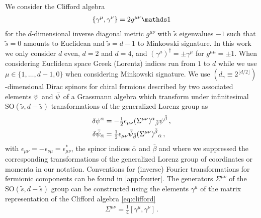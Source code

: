We consider the Clifford algebra
\begin{align}
	\{\gamma^\mu,\gamma^\nu\}=2 g^{\mu\nu}\Id\label{eq:clifford}
\end{align}
for the $d$-dimensional inverse diagonal metric $g^{\mu\nu}$ with $\tilde{s}$ eigenvalues $-1$ such that $\tilde{s}=0$ amounts to Euclidean and $\tilde{s}=d-1$ to Minkowski signature.
In this work we only consider $d$ even, \viz{} $d=2$ and $d=4$, and $(\gamma^\mu)^\dagger = \pm\gamma^\mu$ for $g^{\mu\mu}=\pm1$.
When considering Euclidean space Greek (Lorentz) indices run from $1$ to $d$ while we use $\mu\in\{1,\ldots,d-1,0\}$ when considering Minkowski signature.
We use ${(d_\gamma\equiv 2^{\lfloor d/2\rfloor})}$-dimensional Dirac spinors for chiral fermions described by two associated elements $\psi$ and $\bar{\psi}$ of a Grassmann algebra which transform under infinitesimal $\mathrm{SO}(\tilde{s},d-\tilde{s})$ transformations of the generalized Lorenz group as
\begin{align}
	\delta\psi^{\bar{\alpha}} &= -\tfrac{1}{2}\epsilon_{\mu\nu}(\Sigma^{\mu\nu})^{\bar{\alpha}}{}_{\bar{\beta}} \psi^{\bar{\beta}} \, ,\\
	\delta\bar{\psi}_{\bar{\alpha}} &= \tfrac{1}{2}\epsilon_{\mu\nu}\bar{\psi}_{\bar{\beta}}(\Sigma^{\mu\nu})^{\bar{\beta}}{}_{\bar{\alpha}} \, ,
\end{align}
with ${	\epsilon_{\mu\nu}=-\epsilon_{\nu\mu}=\epsilon_{\mu\nu}^\ast}$, the spinor indices $\bar{\alpha}$ and $\bar{\beta}$ and where we suppressed the corresponding transformations of the generalized Lorenz group of coordinates or momenta in our notation.
Conventions for (inverse) Fourier transformations for fermionic components can be found in \cref{app:fourier}.
The generators $\Sigma^{\mu\nu}$ of the $\mathrm{SO}(\tilde{s},d-\tilde{s})$ group can be constructed using the elements $\gamma^\mu$ of the matrix representation of the Clifford algebra \eqref{eq:clifford}
\begin{align}
	\Sigma^{\mu\nu} = \frac{1}{4}[\gamma^\mu,\gamma^\nu] \, .
\end{align}

